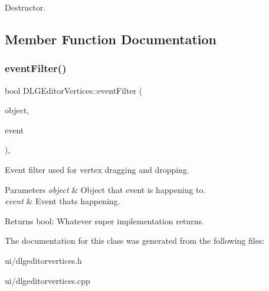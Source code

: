 Destructor. 



\subsection{Member Function Documentation}
\mbox{\label{class_d_l_g_editor_vertices_a2e6c698e2749d8c3a2dedcdcf95a1c79}} 
\subsubsection{\texorpdfstring{eventFilter()}{eventFilter()}}
{\footnotesize\ttfamily bool D\+L\+G\+Editor\+Vertices\+::event\+Filter (\begin{DoxyParamCaption}\item[{Q\+Object $\ast$}]{object,  }\item[{Q\+Event $\ast$}]{event }\end{DoxyParamCaption})\hspace{0.3cm}{\ttfamily [override]}, {\ttfamily [protected]}}



Event filter used for vertex dragging and dropping. 


\begin{DoxyParams}{Parameters}
{\em object} & Object that event is happening to. \\
\hline
{\em event} & Event that\textquotesingle{}s happening. \\
\hline
\end{DoxyParams}
\begin{DoxyReturn}{Returns}
bool\+: Whatever super implementation returns. 
\end{DoxyReturn}


The documentation for this class was generated from the following files\+:\begin{DoxyCompactItemize}
\item 
ui/dlgeditorvertices.\+h\item 
ui/dlgeditorvertices.\+cpp\end{DoxyCompactItemize}
